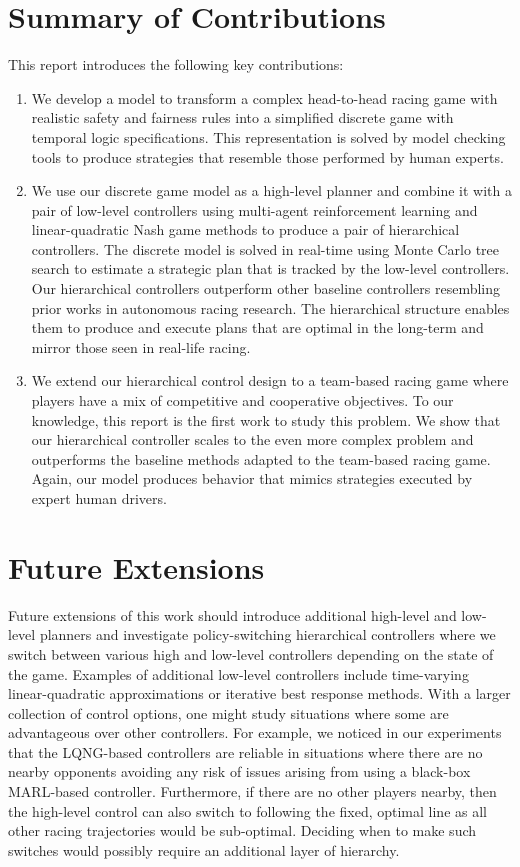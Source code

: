 \section{Summary of Contributions}
This report introduces the following key contributions:
\begin{enumerate}
    \item We develop a model to transform a complex head-to-head racing game with realistic safety and fairness rules into a simplified discrete game with temporal logic specifications. This representation is solved by model checking tools to produce strategies that resemble those performed by human experts.
    
    \item We use our discrete game model as a high-level planner and combine it with a pair of low-level controllers using multi-agent reinforcement learning and linear-quadratic Nash game methods to produce a pair of hierarchical controllers. The discrete model is solved in real-time using Monte Carlo tree search to estimate a strategic plan that is tracked by the low-level controllers. Our hierarchical controllers outperform other baseline controllers resembling prior works in autonomous racing research. The hierarchical structure enables them to produce and execute plans that are optimal in the long-term and mirror those seen in real-life racing.
    
    \item We extend our hierarchical control design to a team-based racing game where players have a mix of competitive and cooperative objectives. To our knowledge, this report is the first work to study this problem. We show that our hierarchical controller scales to the even more complex problem and outperforms the baseline methods adapted to the team-based racing game. Again, our model produces behavior that mimics strategies executed by expert human drivers.
\end{enumerate}
\section{Future Extensions}
Future extensions of this work should introduce additional high-level and low-level planners and investigate policy-switching hierarchical controllers where we switch between various high and low-level controllers depending on the state of the game. Examples of additional low-level controllers include time-varying linear-quadratic approximations or iterative best response methods. With a larger collection of control options, one might study situations where some are advantageous over other controllers. For example, we noticed in our experiments that the LQNG-based controllers are reliable in situations where there are no nearby opponents avoiding any risk of issues arising from using a black-box MARL-based controller. Furthermore, if there are no other players nearby, then the high-level control can also switch to following the fixed, optimal line as all other racing trajectories would be sub-optimal. Deciding when to make such switches would possibly require an additional layer of hierarchy.

